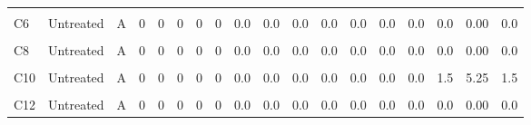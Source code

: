 \documentclass[12pt,final,CPage]{ufthesis}
\begin{document}
{\begin{table}
{\begin{tabular}[t]{lllrrrrrrrrrrrrrrr}
  \cellcolor{gray!6}{C5} & \cellcolor{gray!6}{Untreated} & \cellcolor{gray!6}{A} & \cellcolor{gray!6}{0} & \cellcolor{gray!6}{0} & \cellcolor{gray!6}{0} & \cellcolor{gray!6}{0} & \cellcolor{gray!6}{0} & \cellcolor{gray!6}{0.0} & \cellcolor{gray!6}{0.0} & \cellcolor{gray!6}{0.0} & \cellcolor{gray!6}{0.0} & \cellcolor{gray!6}{0.0} & \cellcolor{gray!6}{0.0} & \cellcolor{gray!6}{0.0} & \cellcolor{gray!6}{0.0} & \cellcolor{gray!6}{0.00} & \cellcolor{gray!6}{0.0}\\
  C6 & Untreated & A & 0 & 0 & 0 & 0 & 0 & 0.0 & 0.0 & 0.0 & 0.0 & 0.0 & 0.0 & 0.0 & 0.0 & 0.00 & 0.0\\
  \cellcolor{gray!6}{C7} & \cellcolor{gray!6}{Untreated} & \cellcolor{gray!6}{A} & \cellcolor{gray!6}{0} & \cellcolor{gray!6}{0} & \cellcolor{gray!6}{0} & \cellcolor{gray!6}{0} & \cellcolor{gray!6}{0} & \cellcolor{gray!6}{0.0} & \cellcolor{gray!6}{0.0} & \cellcolor{gray!6}{0.0} & \cellcolor{gray!6}{0.0} & \cellcolor{gray!6}{0.0} & \cellcolor{gray!6}{0.0} & \cellcolor{gray!6}{0.0} & \cellcolor{gray!6}{0.0} & \cellcolor{gray!6}{0.00} & \cellcolor{gray!6}{0.0}\\
  C8 & Untreated & A & 0 & 0 & 0 & 0 & 0 & 0.0 & 0.0 & 0.0 & 0.0 & 0.0 & 0.0 & 0.0 & 0.0 & 0.00 & 0.0\\
  \cellcolor{gray!6}{C9} & \cellcolor{gray!6}{Untreated} & \cellcolor{gray!6}{A} & \cellcolor{gray!6}{0} & \cellcolor{gray!6}{0} & \cellcolor{gray!6}{0} & \cellcolor{gray!6}{0} & \cellcolor{gray!6}{0} & \cellcolor{gray!6}{0.0} & \cellcolor{gray!6}{0.0} & \cellcolor{gray!6}{0.0} & \cellcolor{gray!6}{0.0} & \cellcolor{gray!6}{0.0} & \cellcolor{gray!6}{0.0} & \cellcolor{gray!6}{0.0} & \cellcolor{gray!6}{0.0} & \cellcolor{gray!6}{0.00} & \cellcolor{gray!6}{0.0}\\
  \addlinespace
  C10 & Untreated & A & 0 & 0 & 0 & 0 & 0 & 0.0 & 0.0 & 0.0 & 0.0 & 0.0 & 0.0 & 0.0 & 1.5 & 5.25 & 1.5\\
  \cellcolor{gray!6}{C11} & \cellcolor{gray!6}{Untreated} & \cellcolor{gray!6}{A} & \cellcolor{gray!6}{0} & \cellcolor{gray!6}{0} & \cellcolor{gray!6}{0} & \cellcolor{gray!6}{0} & \cellcolor{gray!6}{0} & \cellcolor{gray!6}{0.0} & \cellcolor{gray!6}{0.0} & \cellcolor{gray!6}{0.0} & \cellcolor{gray!6}{0.0} & \cellcolor{gray!6}{0.0} & \cellcolor{gray!6}{0.0} & \cellcolor{gray!6}{0.0} & \cellcolor{gray!6}{0.0} & \cellcolor{gray!6}{0.00} & \cellcolor{gray!6}{0.0}\\
  C12 & Untreated & A & 0 & 0 & 0 & 0 & 0 & 0.0 & 0.0 & 0.0 & 0.0 & 0.0 & 0.0 & 0.0 & 0.0 & 0.00 & 0.0\\
  \bottomrule
  \end{tabular}}
  \end{table}
  \begin{figure}


\end{figure}}
\end{document}
